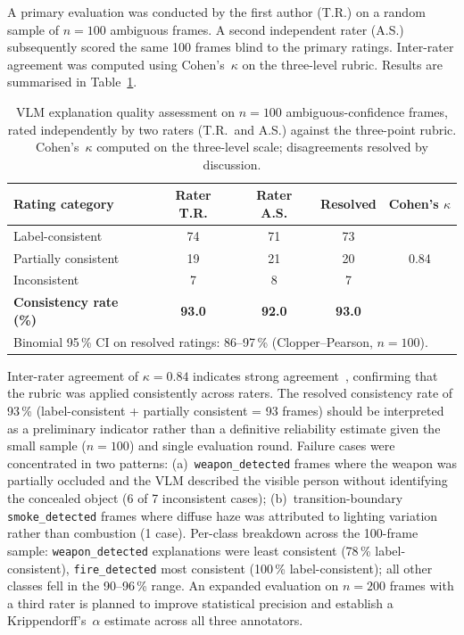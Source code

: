 \documentclass[sensors,article,submit,pdftex,moreauthors]{Definitions/mdpi}
\begin{document}
A primary evaluation was conducted by the first author (T.R.) on a random sample of $n=100$ ambiguous frames. A second independent rater (A.S.) subsequently scored the same 100 frames blind to the primary ratings. Inter-rater agreement was computed using Cohen's~$\kappa$ on the three-level rubric. Results are summarised in Table~\ref{tab:vlm-quality}.
 
\begin{table}[H]
\caption{VLM explanation quality assessment on $n=100$ ambiguous-confidence frames, rated independently by two raters (T.R.\ and A.S.) against the three-point rubric. Cohen's~$\kappa$ computed on the three-level scale; disagreements resolved by discussion.}
\label{tab:vlm-quality}
\centering\small\setlength{\tabcolsep}{5pt}
\begin{tabular}{lcccc}
\toprule
\textbf{Rating category} & \textbf{Rater T.R.} & \textbf{Rater A.S.} & \textbf{Resolved} & \textbf{Cohen's $\kappa$} \\
\midrule
Label-consistent      & 74 & 71 & 73 & \multirow{3}{*}{0.84} \\
Partially consistent  & 19 & 21 & 20 & \\
Inconsistent          & 7  & 8  & 7  & \\
\midrule
\textbf{Consistency rate (\%)} & \textbf{93.0} & \textbf{92.0} & \textbf{93.0} & \\
\multicolumn{5}{l}{\small Binomial 95\,\% CI on resolved ratings: 86--97\,\% (Clopper--Pearson, $n=100$).} \\
\bottomrule
\end{tabular}
\end{table}
 
Inter-rater agreement of $\kappa = 0.84$ indicates strong agreement~\cite{landis1977measurement}, confirming that the rubric was applied consistently across raters. The resolved consistency rate of 93\,\% (label-consistent + partially consistent = 93 frames) should be interpreted as a preliminary indicator rather than a definitive reliability estimate given the small sample ($n=100$) and single evaluation round. Failure cases were concentrated in two patterns: (a)~\texttt{weapon\_detected} frames where the weapon was partially occluded and the VLM described the visible person without identifying the concealed object (6 of 7 inconsistent cases); (b)~transition-boundary \texttt{smoke\_detected} frames where diffuse haze was attributed to lighting variation rather than combustion (1 case). Per-class breakdown across the 100-frame sample: \texttt{weapon\_detected} explanations were least consistent (78\,\% label-consistent), \texttt{fire\_detected} most consistent (100\,\% label-consistent); all other classes fell in the 90--96\,\% range. An expanded evaluation on $n=200$ frames with a third rater is planned to improve statistical precision and establish a Krippendorff's~$\alpha$ estimate across all three annotators.
 
\end{document}
